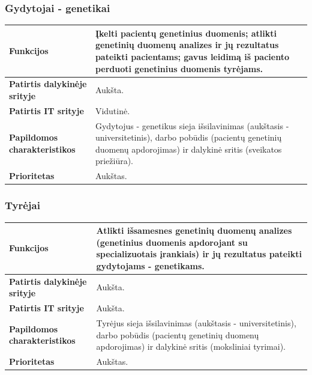\documentclass[12pt]{article}
\begin{document}
\subsubsection*{Gydytojai - genetikai}
\label{sec:N2}
\begin{table}[htb!]
    \captionsetup{justification=centering}
    \vskip -10pt
    \begin{tabular}{|m{4cm}|m{12cm}|}
        \hline
        \raggedleft \textbf{\cellcolor{deepchampagne}Funkcijos} &
        Įkelti pacientų genetinius duomenis; atlikti genetinių duomenų analizes
        ir jų rezultatus pateikti pacientams; gavus leidimą iš paciento perduoti
        genetinius duomenis tyrėjams. \\
        \hline
        \raggedleft \textbf{\cellcolor{deepchampagne}Patirtis dalykinėje
        srityje} & Aukšta. \\
        \hline
        \raggedleft \textbf{\cellcolor{deepchampagne}Patirtis IT srityje} &
        Vidutinė. \\
        \hline
        \raggedleft \textbf{\cellcolor{deepchampagne}Papildomos
        charakteristikos} &
        Gydytojus - genetikus sieja išsilavinimas (aukštasis - universitetinis),
        darbo pobūdis (pacientų genetinių duomenų apdorojimas) ir dalykinė
        sritis (sveikatos priežiūra). \\
        \hline
        \raggedleft \textbf{\cellcolor{deepchampagne}Prioritetas} & Aukštas. \\
        \hline
    \end{tabular}
\end{table}

\subsubsection*{Tyrėjai}
\label{sec:N3}
\begin{table}[htb!]
    \captionsetup{justification=centering}
    \vskip -10pt
    \begin{tabular}{|m{4cm}|m{12cm}|}
        \hline
        \raggedleft \textbf{\cellcolor{deepchampagne}Funkcijos} &
        Atlikti išsamesnes genetinių duomenų analizes (genetinius duomenis
        apdorojant su specializuotais įrankiais) ir jų rezultatus pateikti
        gydytojams - genetikams. \\
        \hline
        \raggedleft \textbf{\cellcolor{deepchampagne}Patirtis dalykinėje
        srityje} & Aukšta. \\
        \hline
        \raggedleft \textbf{\cellcolor{deepchampagne}Patirtis IT srityje} &
        Aukšta. \\
        \hline
        \raggedleft \textbf{\cellcolor{deepchampagne}Papildomos
        charakteristikos} &
        Tyrėjus sieja išsilavinimas (aukštasis - universitetinis), darbo pobūdis
        (pacientų genetinių duomenų apdorojimas) ir dalykinė sritis (moksliniai
        tyrimai). \\
        \hline
        \raggedleft \textbf{\cellcolor{deepchampagne}Prioritetas} & Aukštas. \\
        \hline
    \end{tabular}
\end{table}
\end{document}
